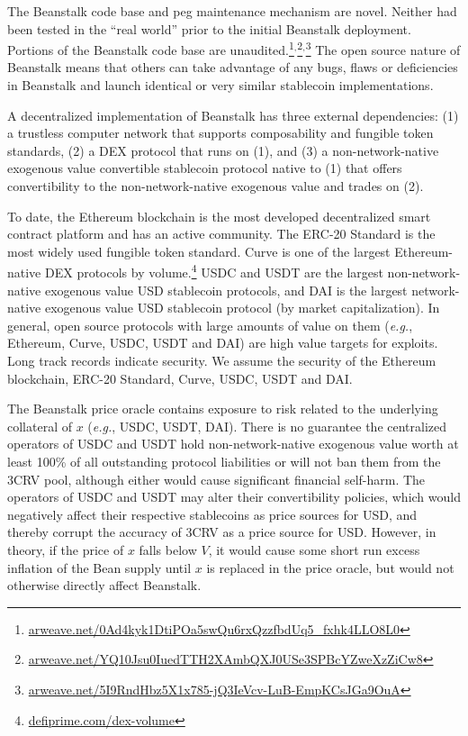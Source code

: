 \documentclass[tikz]{article}
\newcommand{\term}[1]{\textsl{#1}}
\newcommand{\fref}[1]{\footnote{\href{http://#1}{#1}}}
\begin{document}
The Beanstalk code base and peg maintenance mechanism are novel. Neither had been tested in the “real world” prior to the initial Beanstalk deployment. Portions of the Beanstalk code base are unaudited.\footnote{\href{https://2adxrezjguhnrdzzvzwmcc52v4kdhtpw3vjk4x6gde4czm54f4.arweave.net/0Ad4kyk1DtiPOa5swQu6rxQzzfbdUq5\_fxhk4LLO8L0}{arweave.net/0Ad4kyk1DtiPOa5swQu6rxQzzfbdUq5\_fxhk4LLO8L0}}$^{,}$\footnote{\href{https://megxijwlwqrophkngh3fycm3ifzhiujhw5epaxdbtqpf6ntcbmhq.arweave.net/YQ10Jsu0IuedTTH2XAmbQXJ0USe3SPBcYZweXzZiCw8}{arweave.net/YQ10Jsu0IuedTTH2XAmbQXJ0USe3SPBcYZweXzZiCw8}}$^{,}$\footnote{\href{https://4shvdhor3phzl5ohx44y2doipfls6lxaisnjfavqsgnpj24a.arweave.net/5I9RndHbz5X1x785-jQ3IeVcv-LuB-EmpKCsJGa9OuA}{arweave.net/5I9RndHbz5X1x785-jQ3IeVcv-LuB-EmpKCsJGa9OuA}} The open source nature of Beanstalk means that others can take advantage of any bugs, flaws or deficiencies in Beanstalk and launch identical or very similar stablecoin implementations.

A decentralized implementation of Beanstalk has three external dependencies: (1) a trustless computer network that supports composability and fungible token standards, (2) a DEX protocol that runs on (1), and (3) a non-network-native exogenous value convertible stablecoin protocol native to (1) that offers convertibility to the non-network-native exogenous value and trades on (2). 

To date, the Ethereum blockchain is the most developed decentralized smart contract platform and has an active community. The ERC-20 Standard is the most widely used fungible token standard. Curve is one of the largest Ethereum-native DEX protocols by volume.\fref{defiprime.com/dex-volume} USDC and USDT are the largest non-network-native exogenous value USD stablecoin protocols, and DAI is the largest network-native exogenous value USD stablecoin protocol (by market capitalization). In general, open source protocols with large amounts of value on them (\term{e.g.}, Ethereum, Curve, USDC, USDT and DAI) are high value targets for exploits. Long track records indicate security. We assume the security of the Ethereum blockchain, ERC-20 Standard, Curve, USDC, USDT and DAI.

The Beanstalk price oracle contains exposure to risk related to the underlying collateral of $x$ (\term{e.g.}, USDC, USDT, DAI). There is no guarantee the centralized operators of USDC and USDT hold non-network-native exogenous value worth at least 100\% of all outstanding protocol liabilities or will not ban them from the 3CRV pool, although either would cause significant financial self-harm. The operators of USDC and USDT may alter their convertibility policies, which would negatively affect their respective stablecoins as price sources for USD, and thereby corrupt the accuracy of 3CRV as a price source for USD. However, in theory, if the price of $x$ falls below $V$, it would cause some short run excess inflation of the Bean supply until $x$ is replaced in the price oracle, but would not otherwise directly affect Beanstalk.
\end{document}
